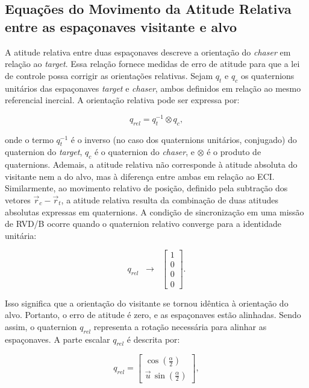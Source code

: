 \subsection{Equações do Movimento da Atitude Relativa entre as espaçonaves visitante e alvo}

A atitude relativa entre duas espaçonaves descreve a orientação do \emph{chaser} em relação ao \emph{target}.
Essa relação fornece medidas de erro de atitude para que a lei de controle possa corrigir as orientações relativas.
Sejam $q_t$ e $q_c$ os quaternions unitários das espaçonaves \emph{target} e \emph{chaser}, ambos definidos em relação ao mesmo referencial inercial. 
A orientação relativa pode ser expressa por:

\begin{equation}
    \label{eq:quat_relativo}
q_{rel}
=
q_t^{-1} \otimes q_c,
\end{equation}

onde o termo $q_t^{-1}$ é o inverso (no caso dos quaternions unitários, conjugado) do quaternion do \emph{target}, $q_c$ é o quaternion do \emph{chaser}, e $\otimes$ é o produto de quaternions.
Ademais, a atitude relativa não corresponde à atitude absoluta do visitante nem a do alvo, mas à diferença entre ambas em relação ao ECI. 
Similarmente, ao movimento relativo de posição, definido pela subtração dos vetores $\vec r_c - \vec r_t$, a atitude relativa resulta da combinação de duas atitudes absolutas expressas em quaternions. 
A condição de sincronização em uma missão de RVD/B ocorre quando o quaternion relativo converge para a identidade unitária:

\begin{equation}
\label{eq:qrel_sincronizacao}
q_{rel} \;\;\longrightarrow\;\; 
\begin{bmatrix}1 \\ 0 \\ 0 \\ 0\end{bmatrix}.
\end{equation}

Isso significa que a orientação do visitante se tornou idêntica à orientação do alvo. 
Portanto, o erro de atitude é zero, e as espaçonaves estão alinhadas.
Sendo assim, o quaternion $q_{rel}$ representa a rotação necessária para alinhar as espaçonaves.
A parte escalar $q_{rel}$ é descrita por:

\begin{equation}
q_{rel} =
\begin{bmatrix}
\cos\!\left(\tfrac{\alpha}{2}\right) \\[4pt]
\vec{u}\,\sin\!\left(\tfrac{\alpha}{2}\right)
\end{bmatrix},
\end{equation}

